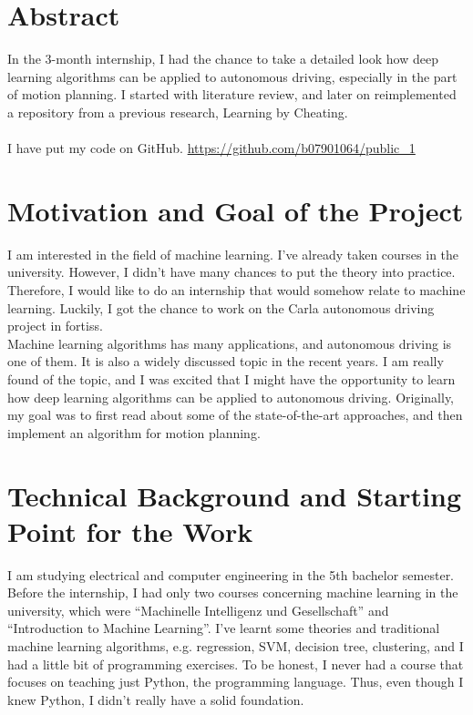 \documentclass[inputenc=utf8]{ldvarticle}
\begin{document}
\pagebreak[4]

%
\section*{Abstract}
In the 3-month internship, I had the chance to take a detailed look how deep learning algorithms can be applied to autonomous driving, especially in the part of motion planning. I started with literature review, and later on reimplemented a repository from a previous research, \cite{chen2019lbc} Learning by Cheating. \\
\noindent \\I have put my code on GitHub. \url{https://github.com/b07901064/public_1}

\section{Motivation and Goal of the Project}
I am interested in the field of machine learning. I’ve already taken courses in the university. However, I didn’t have many chances to put the theory into practice. Therefore, I would like to do an internship that would somehow relate to machine learning. Luckily, I got the chance to work on the \cite{Dosovitskiy2017CARLAAO} Carla autonomous driving project in fortiss.
\\

\noindent Machine learning algorithms has many applications, and autonomous driving is one of them. It is also a widely discussed topic in the recent years. I am really found of the topic, and I was excited that I might have the opportunity to learn how deep learning algorithms can be applied to autonomous driving. Originally, my goal was to first read about some of the state-of-the-art approaches, and then implement an algorithm for motion planning.

\section{Technical Background and Starting Point for the Work}

I am studying electrical and computer engineering in the 5th bachelor semester. Before the internship, I had only two courses concerning machine learning in the university, which were “Machinelle Intelligenz und Gesellschaft” and “Introduction to Machine Learning”. I’ve learnt some theories and traditional machine learning algorithms, e.g. regression, SVM, decision tree, clustering, and I had a little bit of programming exercises. To be honest, I never had a course that focuses on teaching just Python, the programming language. Thus, even though I knew Python, I didn’t really have a solid foundation.
\\
\end{document}
